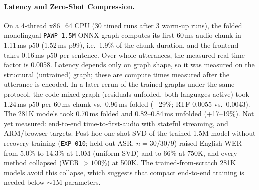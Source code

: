 \begin{table}[t]
\centering
\caption{\textbf{Independent re-scoring} (\texttt{EXP-018/019}). ASR: a second mixed-script recognizer not used for data filtering (held-out $n=30$ EN / 30 NE). PER: public \texttt{wav2vec2-xlsr-53-espeak-cv-ft} phone recognizer, both sides mapped to a shared 39-phone set (test $n=300$ EN / 300 NE). Mix: new 160-sentence code-mixed set (1,633 words), micro-averaged. 281K rows: mean$\pm$std over seeds 42/101/202.}
\label{tab:indep}
\footnotesize
\setlength{\tabcolsep}{2.5pt}
\end{table}

\paragraph{Latency and Zero-Shot Compression.}
On a 4-thread x86\_64 CPU (30 timed runs after 3 warm-up runs), the folded monolingual \texttt{PAWP-1.5M} ONNX graph computes its first 60\,ms audio chunk in 1.11\,ms p50 (1.52\,ms p99), i.e.\ 1.9\% of the chunk duration, and the frontend takes 0.16\,ms p50 per sentence. Over whole utterances, the measured real-time factor is 0.0058. Latency depends only on graph shape, so it was measured on the structural (untrained) graph; these are compute times measured after the utterance is encoded. In a later rerun of the trained graphs under the same protocol, the code-mixed graph (residuals unfolded, both languages active) took 1.24\,ms p50 per 60\,ms chunk vs.\ 0.96\,ms folded (+29\%; RTF 0.0055 vs.\ 0.0043). The 281K models took 0.70\,ms folded and 0.82--0.84\,ms unfolded (+17--19\%). Not yet measured: end-to-end time-to-first-audio with stateful streaming, and ARM/browser targets. Post-hoc one-shot SVD of the trained 1.5M model without recovery training (\texttt{EXP-010}; held-out ASR, $n=30/30/9$) raised English WER from 5.0\% to 14.3\% at 1.0M (uniform SVD) and to 66\% at 750K, and every method collapsed (WER $>100\%$) at 500K. The trained-from-scratch 281K models avoid this collapse, which suggests that compact end-to-end training is needed below $\sim$1M parameters.
